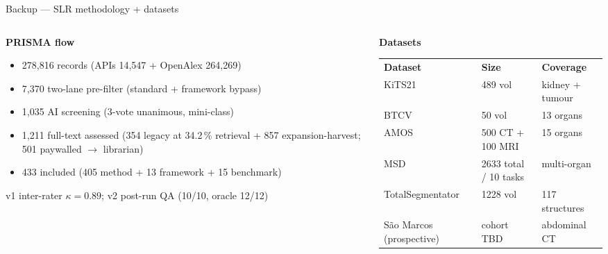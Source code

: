 \documentclass[aspectratio=169,11pt,xcolor=table]{beamer}
\begin{document}
\begin{frame}{Backup --- SLR methodology + datasets}
\scriptsize
\begin{columns}[T]
\begin{column}{0.48\linewidth}
\textbf{PRISMA flow}
\begin{itemize}\itemsep1pt
  \item 278{,}816 records (APIs 14{,}547 + OpenAlex 264{,}269)
  \item 7{,}370 two-lane pre-filter (standard + framework bypass)
  \item 1{,}035 AI screening (3-vote unanimous, mini-class)
  \item 1{,}211 full-text assessed (354 legacy at 34.2\,\% retrieval + 857 expansion-harvest; 501 paywalled $\to$ librarian)
  \item 433 included (405 method + 13 framework + 15 benchmark)
\end{itemize}
\vspace{0.15cm}
v1 inter-rater $\kappa = 0.89$; v2 post-run QA (10/10, oracle 12/12)
\end{column}
\begin{column}{0.50\linewidth}
\textbf{Datasets}\\[2pt]
\tiny
\begin{tabular}{p{2.1cm}p{1.8cm}p{1.8cm}}
\textbf{Dataset} & \textbf{Size} & \textbf{Coverage} \\
KiTS21 & 489 vol & kidney + tumour \\
BTCV & 50 vol & 13 organs \\
AMOS & 500 CT + 100 MRI & 15 organs \\
MSD & 2633 total / 10 tasks & multi-organ \\
TotalSegmentator & 1228 vol & 117 structures \\
S\~ao Marcos (prospective) & cohort TBD & abdominal CT \\
\end{tabular}
\end{column}
\end{columns}
\end{frame}
\end{document}
